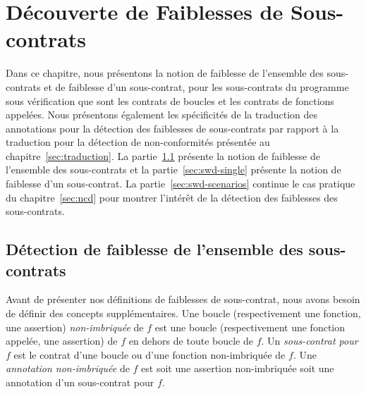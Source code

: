 
\chapter{Découverte de Faiblesses de Sous-contrats}
\label{sec:swd}

\chapterintro

Dans ce chapitre, nous présentons la notion de faiblesse de l'ensemble des
sous-contrats et de faiblesse d'un sous-contrat, pour les sous-contrats du
programme sous vérification que sont les contrats de boucles et les contrats
de fonctions appelées.
Nous présentons également les spécificités de la traduction des annotations pour
la détection des faiblesses de sous-contrats par rapport à la traduction pour la
détection de non-conformités présentée au chapitre~\ref{sec:traduction}.
La partie~\ref{sec:swd-global} présente la notion de faiblesse de l'ensemble des
sous-contrats et la partie~\ref{sec:swd-single} présente la notion de faiblesse
d'un sous-contrat.
La partie~\ref{sec:swd-scenarios} continue le cas pratique du
chapitre~\ref{sec:ncd} pour montrer l'intérêt de la détection des faiblesses
des sous-contrats.


\section{Détection de faiblesse de l'ensemble des sous-contrats}
\label{sec:swd-global}


Avant de présenter nos définitions de faiblesses de sous-contrat, nous avons
besoin de définir des concepts supplémentaires.
Une boucle (respectivement une fonction, une assertion) \emph{non-imbriquée} de
$f$ est une boucle (respectivement une fonction appelée, une assertion) de $f$
en dehors de toute boucle de $f$.
Un \emph{sous-contrat pour $f$} est le contrat d'une boucle ou d'une fonction
non-imbriquée de $f$.
Une \emph{annotation non-imbriquée} de $f$ est soit une assertion non-imbriquée
soit une annotation d'un sous-contrat pour $f$.

